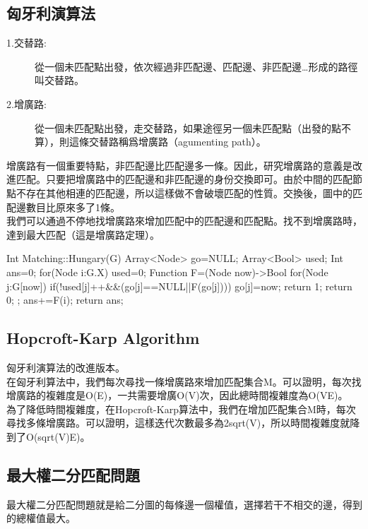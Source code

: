 \documentclass{article}
\begin{document}
\subsection{匈牙利演算法}
\begin{description}
\item[ 1.交替路:]從一個未匹配點出發，依次經過非匹配邊、匹配邊、非匹配邊…形成的路徑叫交替路。
\item[ 2.增廣路:]從一個未匹配點出發，走交替路，如果途徑另一個未匹配點（出發的點不算），則這條交替路稱爲增廣路（agumenting path）。
\end{description}
增廣路有一個重要特點，非匹配邊比匹配邊多一條。因此，研究增廣路的意義是改進匹配。只要把增廣路中的匹配邊和非匹配邊的身份交換即可。由於中間的匹配節點不存在其他相連的匹配邊，所以這樣做不會破壞匹配的性質。交換後，圖中的匹配邊數目比原來多了1條。\\
我們可以通過不停地找增廣路來增加匹配中的匹配邊和匹配點。找不到增廣路時，達到最大匹配（這是增廣路定理）。\\
\newpage
\begin{algorithm}[caption={Hungary}, label={alg1}]
Int Matching::Hungary(G)
    Array<Node> go=NULL;
    Array<Bool> used;
    Int ans=0;
    for(Node i:G.X)
        used=0;
        Function F=(Node now)->Bool{
            for(Node j:G[now])
                if(!used[j]++&&(go[j]==NULL||F(go[j])))
                    go[j]=now;
                    return 1;
            return 0;
            };
        ans+=F(i);
    return ans;
\end{algorithm}  
\subsection{Hopcroft-Karp Algorithm}
匈牙利演算法的改進版本。\\
在匈牙利算法中，我們每次尋找一條增廣路來增加匹配集合M。可以證明，每次找增廣路的複雜度是O(E)，一共需要增廣O(V)次，因此總時間複雜度為O(VE)。\\
為了降低時間複雜度，在Hopcroft-Karp算法中，我們在增加匹配集合M時，每次尋找多條增廣路。可以證明，這樣迭代次數最多為2sqrt(V)，所以時間複雜度就降到了O(sqrt(V)E)。\\
\subsection{最大權二分匹配問題}
最大權二分匹配問題就是給二分圖的每條邊一個權值，選擇若干不相交的邊，得到的總權值最大。\\
\end{document}
